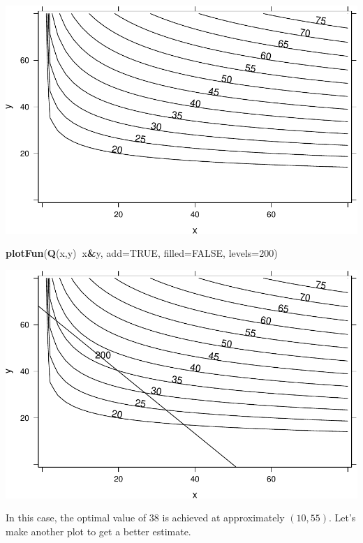 \documentclass[
]{book}
\newenvironment{Shaded}{\begin{snugshade}}{\end{snugshade}}
\newcommand{\DataTypeTok}[1]{\textcolor[rgb]{0.13,0.29,0.53}{#1}}
\newcommand{\DecValTok}[1]{\textcolor[rgb]{0.00,0.00,0.81}{#1}}
\newcommand{\KeywordTok}[1]{\textcolor[rgb]{0.13,0.29,0.53}{\textbf{#1}}}
\newcommand{\NormalTok}[1]{#1}
\newcommand{\OperatorTok}[1]{\textcolor[rgb]{0.81,0.36,0.00}{\textbf{#1}}}
\newcommand{\OtherTok}[1]{\textcolor[rgb]{0.56,0.35,0.01}{#1}}
\begin{document}
\includegraphics{_bookdown_files/math135_handbook_files/figure-latex/unnamed-chunk-53-1.pdf}

\begin{Shaded}
\begin{Highlighting}[]
\KeywordTok{plotFun}\NormalTok{(}\KeywordTok{Q}\NormalTok{(x,y)}\OperatorTok{~}\NormalTok{x}\OperatorTok{&}\NormalTok{y, }\DataTypeTok{add=}\OtherTok{TRUE}\NormalTok{, }\DataTypeTok{filled=}\OtherTok{FALSE}\NormalTok{, }\DataTypeTok{levels=}\DecValTok{200}\NormalTok{)}
\end{Highlighting}
\end{Shaded}

\includegraphics{_bookdown_files/math135_handbook_files/figure-latex/unnamed-chunk-53-2.pdf}

In this case, the optimal value of \(38\) is achieved at approximately \((10, 55)\). Let's make another plot to get a better estimate.
\end{document}
